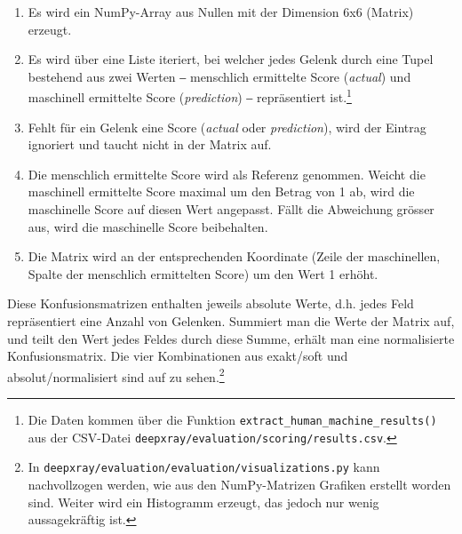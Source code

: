 \begin{enumerate}
    \item Es wird ein NumPy-Array aus Nullen mit der Dimension 6x6 (Matrix) erzeugt.
    \item Es wird über eine Liste iteriert, bei welcher jedes Gelenk durch eine Tupel bestehend aus zwei Werten ‒ menschlich ermittelte Score (\textit{actual}) und maschinell ermittelte Score (\textit{prediction}) ‒ repräsentiert ist.\footnote{Die Daten kommen über die Funktion \texttt{extract\_human\_machine\_results()} aus der CSV-Datei \texttt{deepxray/evaluation/scoring/results.csv}.}
    \item Fehlt für ein Gelenk eine Score (\textit{actual} oder \textit{prediction}), wird der Eintrag ignoriert und taucht nicht in der Matrix auf.
    \item Die menschlich ermittelte Score wird als Referenz genommen. Weicht die maschinell ermittelte Score maximal um den Betrag von 1 ab, wird die maschinelle Score auf diesen Wert angepasst. Fällt die Abweichung grösser aus, wird die maschinelle Score beibehalten.
    \item Die Matrix wird an der entsprechenden Koordinate (Zeile der maschinellen, Spalte der menschlich ermittelten Score) um den Wert 1 erhöht.
\end{enumerate}

Diese Konfusionsmatrizen enthalten jeweils absolute Werte, d.h. jedes Feld repräsentiert eine Anzahl von Gelenken. Summiert man die Werte der Matrix auf, und teilt den Wert jedes Feldes durch diese Summe, erhält man eine normalisierte Konfusionsmatrix. Die vier Kombinationen aus exakt/soft und absolut/normalisiert sind auf  zu sehen.\footnote{In \texttt{deepxray/evaluation/evaluation/visualizations.py} kann nachvollzogen werden, wie aus den NumPy-Matrizen Grafiken erstellt worden sind. Weiter wird ein Histogramm erzeugt, das jedoch nur wenig aussagekräftig ist.}


